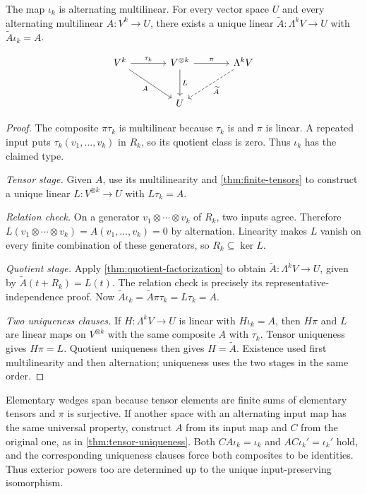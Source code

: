 \begin{theorem}\label{thm:exterior-universal}
The map $\iota_k$ is alternating multilinear. For every vector space $U$
and every alternating multilinear $A:V^k\to U$, there exists a unique
linear $\widetilde A:\Lambda^kV\to U$ with $\widetilde A\iota_k=A$.
\end{theorem}
\[
\begin{tikzcd}[column sep=large,row sep=large]
V^k\arrow[r,"\tau_k"]\arrow[dr,"A"']&V^{\otimes k}\arrow[r,"\pi"]\arrow[d,"L"]
&\Lambda^kV\arrow[dl,dashed,"\widetilde A"]\\
&U&
\end{tikzcd}
\]
\begin{proof}
The composite $\pi\tau_k$ is multilinear because $\tau_k$ is and $\pi$ is
linear. A repeated input puts $\tau_k(v_1,\ldots,v_k)$ in $R_k$, so its
quotient class is zero. Thus $\iota_k$ has the claimed type.

\emph{Tensor stage.} Given $A$, use its multilinearity and
\cref{thm:finite-tensors} to construct a unique linear
$L:V^{\otimes k}\to U$ with $L\tau_k=A$.

\emph{Relation check.} On a generator $v_1\otimes\cdots\otimes v_k$
of $R_k$, two inputs agree. Therefore
$L(v_1\otimes\cdots\otimes v_k)=A(v_1,\ldots,v_k)=0$ by alternation.
Linearity makes $L$ vanish on every finite combination of these generators,
so $R_k\subseteq\ker L$.

\emph{Quotient stage.} Apply \cref{thm:quotient-factorization} to obtain
$\widetilde A:\Lambda^kV\to U$, given by $\widetilde A(t+R_k)=L(t)$.
The relation check is precisely its representative-independence proof.
Now $\widetilde A\iota_k=\widetilde A \pi\tau_k=L\tau_k=A$.

\emph{Two uniqueness clauses.} If $H:\Lambda^kV\to U$ is linear with
$H\iota_k=A$, then $H\pi$ and $L$ are linear maps on $V^{\otimes k}$ with
the same composite $A$ with $\tau_k$. Tensor uniqueness gives $H\pi=L$.
Quotient uniqueness then gives $H=\widetilde A$. Existence used first
multilinearity and then alternation; uniqueness uses the two stages in the
same order.
\end{proof}
Elementary wedges span because tensor elements are finite sums of elementary
tensors and $\pi$ is surjective. If another space with an alternating input
map has the same universal property, construct $A$ from its input map and
$C$ from the original one, as in \cref{thm:tensor-uniqueness}. Both
$CA\iota_k=\iota_k$ and $AC\iota_k'=\iota_k'$ hold, and the corresponding
uniqueness clauses force both composites to be identities. Thus exterior
powers too are determined up to the unique input-preserving isomorphism.

